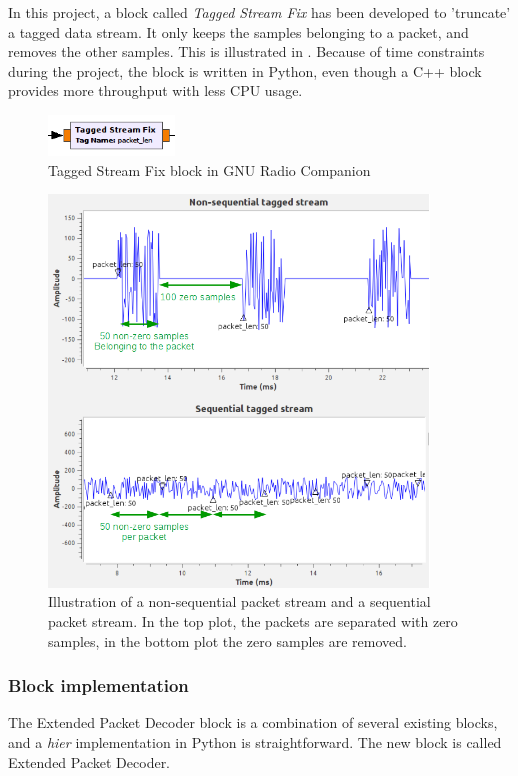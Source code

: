 In this project, a block called \textit{Tagged Stream Fix} has been developed to 'truncate' a tagged data stream. 
It only keeps the samples belonging to a packet, and removes the other samples. This is illustrated in . Because of time constraints during the project, the block is written in Python, even though a C++ block provides more throughput with less CPU usage.
\begin{figure}[H]
    \centering
    \includegraphics[width=0.3\textwidth]{img_packets/streamfix_block.png}
    \caption{Tagged Stream Fix block in GNU Radio Companion}
    \label{fig:streamfix_block}
\end{figure}
\begin{figure}[H]
    \centering
    \includegraphics[width=0.9\textwidth]{img_packets/fixstream.png}
    \caption{Illustration of a non-sequential packet stream and a sequential packet stream. In the top plot, the packets are separated with zero samples, in the bottom plot the zero samples are removed.}
    \label{fig:fixstream}
\end{figure}







\subsubsection{Block implementation}
The Extended Packet Decoder block is a combination of several existing blocks, and a \textit{hier} implementation in Python is straightforward. The new block is called Extended Packet Decoder.\medskip


